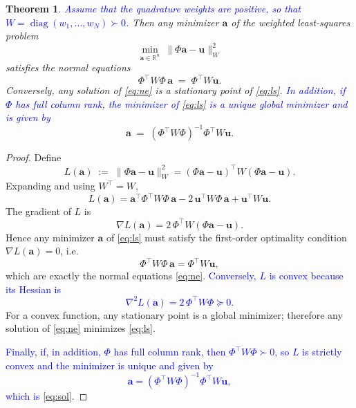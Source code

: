 \documentclass{article}
\newtheorem{theorem}{Theorem}
\theoremstyle{remark}
\begin{document}
\begin{theorem}
\textcolor{blue}{Assume that the quadrature weights are positive, so that
$W=\operatorname{diag}(w_1,\dots,w_N)\succ0$.} 
Then any minimizer $\mathbf{a}$ of the weighted least-squares problem
\begin{equation}\label{eq:ls}
    \min_{\mathbf{a} \in \mathbb{R}^n} \ \| \Phi \mathbf{a} - \mathbf{u} \|_{W}^2
\end{equation}
satisfies the \emph{normal equations}
\begin{equation}\label{eq:ne}
    \Phi^\top W \Phi \, \mathbf{a} \;=\; \Phi^\top W \mathbf{u} .
\end{equation}
Conversely, any solution of \eqref{eq:ne} is a stationary point of \eqref{eq:ls}. 
\textcolor{blue}{In addition, if $\Phi$ has full column rank, the minimizer of \eqref{eq:ls} is a unique global minimizer and is given by}
\begin{equation}\label{eq:sol}
    \mathbf{a} \;=\; (\Phi^\top W \Phi)^{-1} \Phi^\top W \mathbf{u} .
\end{equation}
\end{theorem}

\begin{proof}
Define
\[
L(\mathbf{a})\;:=\;\|\Phi \mathbf{a}-\mathbf{u}\|_W^2=(\Phi \mathbf{a}-\mathbf{u})^\top W(\Phi \mathbf{a}-\mathbf{u}).
\]
Expanding and using $W^\top=W$,
\[
L(\mathbf{a})=\mathbf{a}^\top\Phi^\top W\Phi\,\mathbf{a}-2\,\mathbf{u}^\top W\Phi\,\mathbf{a}+\mathbf{u}^\top W\mathbf{u} .
\]
The gradient of $L$ is 
\[
\nabla L(\mathbf{a})=2\,\Phi^\top W(\Phi \mathbf{a}-\mathbf{u}).
\]
Hence any minimizer $\mathbf{a}$ of \eqref{eq:ls} must satisfy the first-order optimality
condition $\nabla L(\mathbf{a})=0$, i.e.
\[
\Phi^\top W\Phi\,\mathbf{a}=\Phi^\top W\mathbf{u},
\]
which are exactly the normal equations \eqref{eq:ne}.
\textcolor{blue}{
Conversely, $L$ is convex because its Hessian is
\[
\nabla^2 L(\mathbf{a})=2\,\Phi^\top W\Phi\succeq 0 .
\]
}
For a convex function, any stationary point is a global minimizer; therefore any
solution of \eqref{eq:ne} minimizes \eqref{eq:ls}. 

\textcolor{blue}{Finally, if, in addition, $\Phi$ has full column rank, then $\Phi^\top W\Phi\succ 0$, so $L$ is
strictly convex and the minimizer is unique and given by
\[
\mathbf{a}=(\Phi^\top W\Phi)^{-1}\Phi^\top W\mathbf{u},
\]
which is \eqref{eq:sol}.}
\end{proof}
\end{document}

